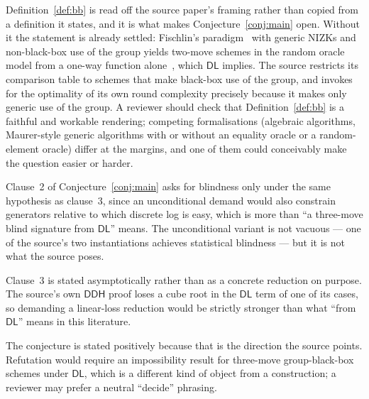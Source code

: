 \documentclass{aicr-conjecture}
\newcommand{\DL}{\mathsf{DL}}
\newcommand{\DDH}{\mathsf{DDH}}
\begin{document}
\begin{remark}\label{rem:bb}
Definition~\ref{def:bb} is read off the source paper's framing rather than
copied from a definition it states, and it is what makes
Conjecture~\ref{conj:main} open. Without it the statement is already
settled: Fischlin's paradigm~\cite{Fis06} with generic NIZKs and
non-black-box use of the group yields two-move schemes in the random
oracle model from a one-way function alone~\cite{CMV26}, which $\DL$
implies. The source restricts its comparison table to schemes that make
black-box use of the group, and invokes~\cite{DKT26} for the optimality of
its own round complexity precisely because it makes only generic use of
the group. A reviewer should check that Definition~\ref{def:bb} is a
faithful and workable rendering; competing formalisations (algebraic
algorithms, Maurer-style generic algorithms with or without an equality
oracle or a random-element oracle) differ at the margins, and one of them
could conceivably make the question easier or harder.
\end{remark}

\begin{remark}[blindness is conditioned on $\DL$]\label{rem:blind}
Clause~2 of Conjecture~\ref{conj:main} asks for blindness only under the
same hypothesis as clause~3, since an unconditional demand would also
constrain generators relative to which discrete log is easy, which is more
than ``a three-move blind signature from $\DL$'' means. The unconditional
variant is not vacuous --- one of the source's two instantiations achieves
statistical blindness --- but it is not what the source poses.
\end{remark}

\begin{remark}\label{rem:asympt}
Clause~3 is stated asymptotically rather than as a concrete reduction on
purpose. The source's own $\DDH$ proof loses a cube root in the $\DL$ term
of one of its cases, so demanding a linear-loss reduction would be
strictly stronger than what ``from $\DL$'' means in this literature.
\end{remark}

\begin{remark}\label{rem:direction}
The conjecture is stated positively because that is the direction the
source points. Refutation would require an impossibility result for
three-move group-black-box schemes under $\DL$, which is a different kind
of object from a construction; a reviewer may prefer a neutral ``decide''
phrasing.
\end{remark}
\end{document}
